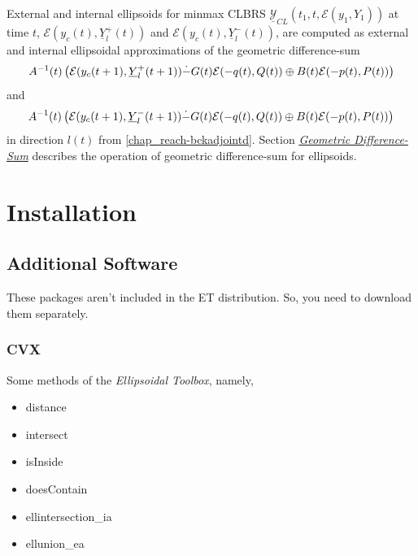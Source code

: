 \documentclass[letterpaper,10pt,english]{sphinxmanual}
\begin{document}
External and internal ellipsoids for minmax CLBRS
$\underline{{\mathcal Y}}_{CL}(t_1,t,{\mathcal E}(y_1,Y_1))$ at
time $t$, ${\mathcal E}(y_c(t),\underline{Y}^+_l(t))$ and
${\mathcal E}(y_c(t),\underline{Y}^-_l(t))$, are computed as
external and internal ellipsoidal approximations of the geometric
difference-sum
\begin{gather}
\begin{split}A^{-1}(t)\left(
{\mathcal E}(y_c(t+1),\underline{Y}^+_l(t+1))
\dot{-}G(t){\mathcal E}(-q(t),Q(t))
\oplus B(t){\mathcal E}(-p(t),P(t))
\right)\end{split}\notag
\end{gather}
and
\begin{gather}
\begin{split}A^{-1}(t)\left(
{\mathcal E}(y_c(t+1),\underline{Y}^-_l(t+1))
\dot{-}G(t){\mathcal E}(-q(t),Q(t))
\oplus B(t){\mathcal E}(-p(t),P(t))
\right)\end{split}\notag
\end{gather}
in direction $l(t)$ from \eqref{chap_reach-bckadjointd}. Section
{\hyperref[chap_ellcalc:diff-sum-label]{\emph{Geometric Difference-Sum}}} describes the operation of geometric
difference-sum for ellipsoids.


\chapter{Installation}
\label{chap_install:installation}\label{chap_install::doc}

\section{Additional Software}
\label{chap_install:additional-software}
These packages aren’t included in the ET distribution. So, you need to
download them separately.


\subsection{CVX}
\label{chap_install:cvx}
Some methods of the \emph{Ellipsoidal Toolbox}, namely,
\begin{itemize}
\item {} 
distance

\item {} 
intersect

\item {} 
isInside

\item {} 
doesContain

\item {} 
ellintersection\_ia

\item {} 
ellunion\_ea

\end{itemize}
\end{document}
